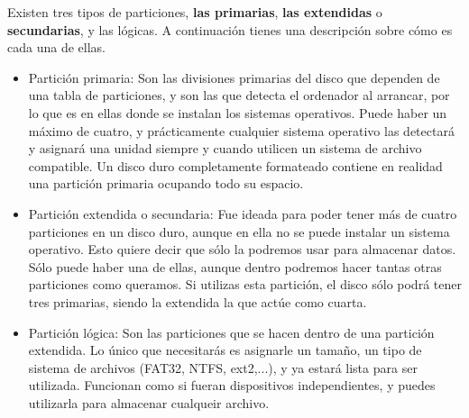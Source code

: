 \documentclass[a4paper, 11pt, oneside]{article}
\begin{document}
\begin{itemize}
Existen tres tipos de particiones, \textbf{las primarias}, \textbf{las extendidas} o \textbf{secundarias}, y las lógicas. A continuación tienes una descripción sobre cómo es cada una de ellas.
\begin{itemize}
    \item Partición primaria: Son las divisiones primarias del disco que dependen de una tabla de particiones, y son las que detecta el ordenador al arrancar, por lo que es en ellas donde se instalan los sistemas operativos. Puede haber un máximo de cuatro, y prácticamente cualquier sistema operativo las detectará y asignará una unidad siempre y cuando utilicen un sistema de archivo compatible. Un disco duro completamente formateado contiene en realidad una partición primaria ocupando todo su espacio.

    \item Partición extendida o secundaria: Fue ideada para poder tener más de cuatro particiones en un disco duro, aunque en ella no se puede instalar un sistema operativo. Esto quiere decir que sólo la podremos usar para almacenar datos. Sólo puede haber una de ellas, aunque dentro podremos hacer tantas otras particiones como queramos. Si utilizas esta partición, el disco sólo podrá tener tres primarias, siendo la extendida la que actúe como cuarta.

    \item Partición lógica: Son las particiones que se hacen dentro de una partición extendida. Lo único que necesitarás es asignarle un tamaño, un tipo de sistema de archivos (FAT32, NTFS, ext2,...), y ya estará lista para ser utilizada. Funcionan como si fueran dispositivos independientes, y puedes utilizarla para almacenar cualqueir archivo.

\end{itemize}


\end{itemize}
\end{document}

